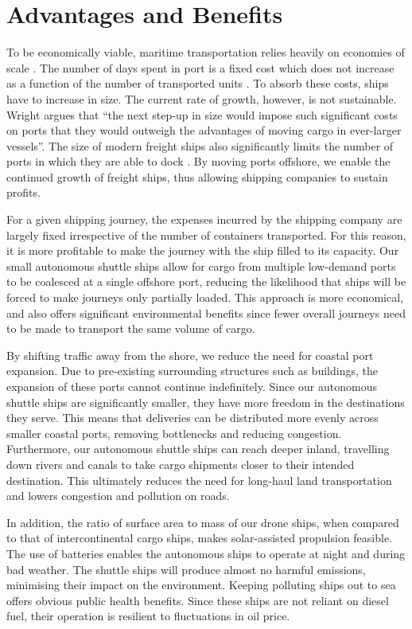 \section{Advantages and Benefits}

To be economically viable, maritime transportation relies heavily on economies of scale \cite{sizematters}. The number of days spent in port is a fixed cost which does not increase as a function of the number of transported units \cite{gkonis2010some}. To absorb these costs, ships have to increase in size. The current rate of growth, however, is not sustainable. Wright \cite{ftarticle} argues that ``the next step-up in size would impose such significant costs on ports that they would outweigh the advantages of moving cargo in ever-larger vessels”. The size of modern freight ships also significantly limits the number of ports in which they are able to dock \cite{sizematters, berth-efficiency}. By moving ports offshore, we enable the continued growth of freight ships, thus allowing shipping companies to sustain profits. 

For a given shipping journey, the expenses incurred by the shipping company are largely fixed irrespective of the number of containers transported. For this reason, it is more profitable to make the journey with the ship filled to its capacity. Our small autonomous shuttle ships allow for cargo from multiple low-demand ports to be coalesced at a single offshore port, reducing the likelihood that ships will be forced to make journeys only partially loaded. This approach is more economical, and also offers significant environmental benefits since fewer overall journeys need to be made to transport the same volume of cargo. 

By shifting traffic away from the shore, we reduce the need for coastal port expansion. Due to pre-existing surrounding structures such as buildings, the expansion of these ports cannot continue indefinitely. Since our autonomous shuttle ships are significantly smaller, they have more freedom in the destinations they serve. This means that deliveries can be distributed more evenly across smaller coastal ports, removing bottlenecks and reducing congestion. Furthermore, our autonomous shuttle ships can reach deeper inland, travelling down rivers and canals to take cargo shipments closer to their intended destination. This ultimately reduces the need for long-haul land transportation and lowers congestion and pollution on roads.

In addition, the ratio of surface area to mass of our drone ships, when compared to that of intercontinental cargo ships, makes solar-assisted propulsion feasible. The use of batteries enables the autonomous ships to operate at night and during bad weather. The shuttle ships will produce almost no harmful emissions, minimising their impact on the environment. Keeping polluting ships out to sea offers obvious public health benefits. Since these ships are not reliant on diesel fuel, their operation is resilient to fluctuations in oil price.

